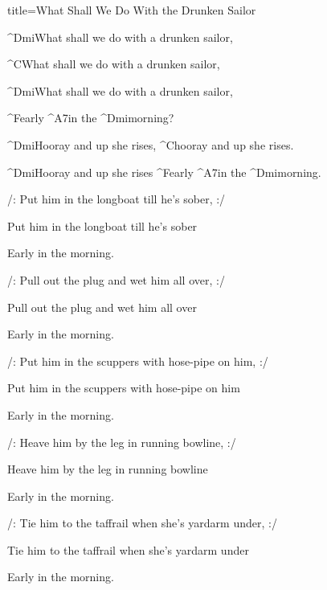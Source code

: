 \begin{song}{title=\predtitle\centering What Shall We Do With the Drunken Sailor \\\large   \vspace*{-0.3cm}}  %
\begin{centerjustified}

\sloka
	^{Dmi}What shall we do with a drunken sailor,

	^{C\z }What shall we do with a drunken sailor,

	^{Dmi}What shall we do with a drunken sailor,

	^{F\z }early ^{A7}in the ^{Dmi\z }morning?


	^{Dmi\z }Hooray and up she rises, ^{C\z }hooray and up she rises.

	^{Dmi\z }Hooray and up she rises ^{F\z }early ^{A7}in the ^{Dmi\z }morning.


\sloka
	/: Put him in the longboat till he's sober, :/

	Put him in the longboat till he's sober

	Early in the morning.



\sloka
	/: Pull out the plug and wet him all over, :/
	
	Pull out the plug and wet him all over
	
	Early in the morning.


\sloka
	/: Put him in the scuppers with hose-pipe on him, :/
	
	Put him in the scuppers with hose-pipe on him
	
	Early in the morning.


\sloka
	/: Heave him by the leg in running bowline, :/

	Heave him by the leg in running bowline

	Early in the morning.


\sloka
	/: Tie him to the taffrail when she's yardarm under, :/

	Tie him to the taffrail when she's yardarm under

	Early in the morning.


\end{centerjustified}
\setcounter{Slokočet}{0}
\end{song}
